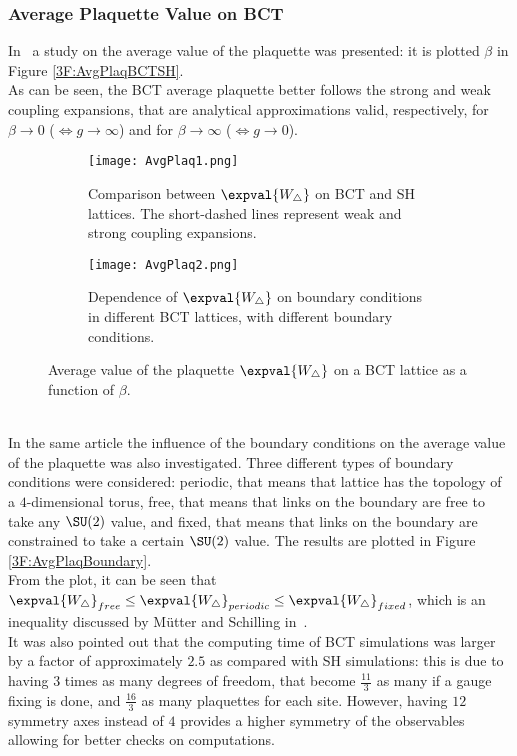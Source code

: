 \subsubsection{Average Plaquette Value on BCT}
In~\cite{Celmaster:1983vy} a study on the average value of the plaquette was presented: it is plotted \wrt $\beta$ in Figure \eqref{3F:AvgPlaqBCTSH}.\\
As can be seen, the BCT average plaquette better follows the strong and weak coupling expansions, that are analytical approximations valid, respectively, for $\beta\to0$ ($\Leftrightarrow g\to\infty$) and for $\beta\to\infty$ ($\Leftrightarrow g\to0$).
\begin{figure}[!htbp]
    \centering
    \begin{subfigure}[b]{0.475\textwidth}
        \texttt{[image: AvgPlaq1.png]}
        \caption{Comparison between $\expval{W_\bigtriangleup}$ on BCT and SH lattices. The short-dashed lines represent weak and strong coupling expansions.}
        \label{3F:AvgPlaqBCTSH}
    \end{subfigure}
    \hfill
    \begin{subfigure}[b]{0.475\textwidth}
        \texttt{[image: AvgPlaq2.png]}
        \caption{Dependence of $\expval{W_\bigtriangleup}$ on boundary conditions in different BCT lattices, with different boundary conditions.}
        \label{3F:AvgPlaqBoundary}
    \end{subfigure}
    \caption{Average value of the plaquette $\expval{W_\bigtriangleup}$ on a BCT lattice as a function of $\beta$.}
\end{figure}\\
In the same article the influence of the boundary conditions on the average value of the plaquette was also investigated.
Three different types of boundary conditions were considered: periodic, that means that lattice has the topology of a $4$-dimensional torus, free, that means that links on the boundary are free to take any $\SU(2)$ value, and fixed, that means that links on the boundary are constrained to take a certain $\SU(2)$ value.
The results are plotted in Figure \eqref{3F:AvgPlaqBoundary}.\\
From the plot, it can be seen that $\expval{W_\bigtriangleup}_{free} \leq \expval{W_\bigtriangleup}_{periodic} \leq \expval{W_\bigtriangleup}_{fixed}$, which is an inequality discussed by Mütter and Schilling in~\cite{Konig:1983dg}.\\
It was also pointed out that the computing time of BCT simulations was larger by a factor of approximately $2.5$ as compared with SH simulations: this is due to having $3$ times as many degrees of freedom, that become $\frac{11}{3}$ as many if a gauge fixing is done, and $\frac{16}{3}$ as many plaquettes for each site.
However, having $12$ symmetry axes instead of $4$ provides a higher symmetry of the observables allowing for better checks on computations.


